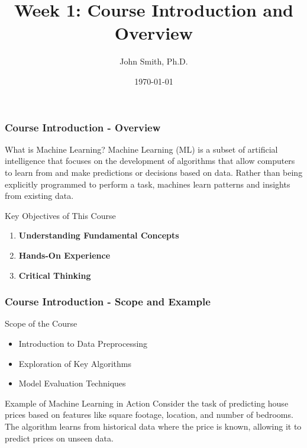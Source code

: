 \documentclass[aspectratio=169]{beamer}
\title[Foundations of Machine Learning]{Week 1: Course Introduction and Overview}
\author[J. Smith]{John Smith, Ph.D.}
\institute[University Name]{
  Department of Computer Science\\
  University Name\\
  \vspace{0.3cm}
  Email: email@university.edu\\
  Website: www.university.edu
}
\date{\today}
\begin{document}
\frame{\titlepage}

\begin{frame}[fragile]
    \frametitle{Course Introduction - Overview}
    \begin{block}{What is Machine Learning?}
        Machine Learning (ML) is a subset of artificial intelligence that focuses on the development of algorithms that allow computers to learn from and make predictions or decisions based on data. 
        Rather than being explicitly programmed to perform a task, machines learn patterns and insights from existing data.
    \end{block}
    
    \begin{block}{Key Objectives of This Course}
        \begin{enumerate}
            \item \textbf{Understanding Fundamental Concepts}
            \item \textbf{Hands-On Experience}
            \item \textbf{Critical Thinking}
        \end{enumerate}
    \end{block}
\end{frame}

\begin{frame}[fragile]
    \frametitle{Course Introduction - Scope and Example}
    \begin{block}{Scope of the Course}
        \begin{itemize}
            \item Introduction to Data Preprocessing
            \item Exploration of Key Algorithms
            \item Model Evaluation Techniques
        \end{itemize}
    \end{block}

    \begin{block}{Example of Machine Learning in Action}
        Consider the task of predicting house prices based on features like square footage, location, and number of bedrooms. 
        The algorithm learns from historical data where the price is known, allowing it to predict prices on unseen data.
    \end{block}
\end{frame}
\end{document}
